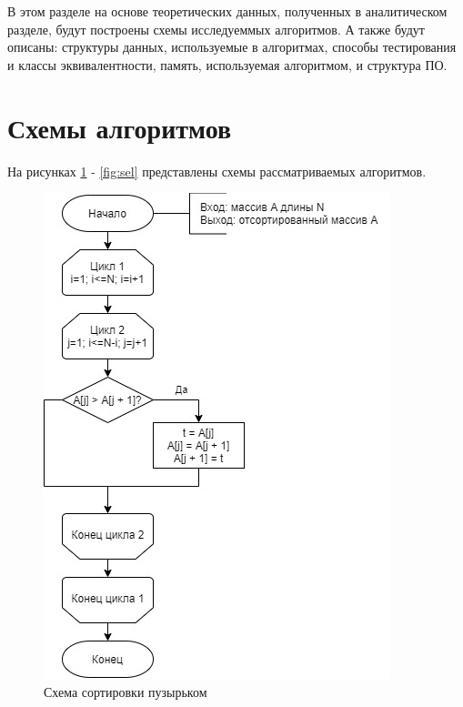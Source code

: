 \documentclass[12pt]{report}
\begin{document}
	В этом разделе на основе теоретических данных, полученных в аналитическом разделе, будут построены схемы исследуеммых алгоритмов. А также будут описаны: структуры данных, используемые в алгоритмах, способы тестирования и классы эквивалентности, память, используемая алгоритмом, и структура ПО.
	
	\section{Схемы алгоритмов}
	На рисунках \ref{fig:bubble} - \ref{fig:sel} представлены схемы рассматриваемых алгоритмов.
	
	\begin{figure}[h]
		\centering
		\includegraphics[width=0.5\linewidth]{bsort.jpg}
		\caption{Схема сортировки пузырьком}
		\label{fig:bubble}
	\end{figure}
	
	\newpage
	
\end{document}
